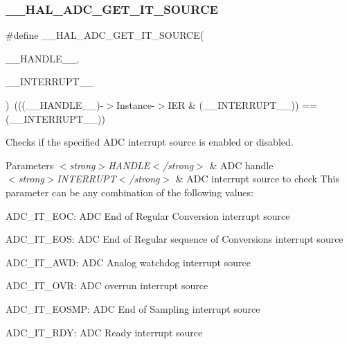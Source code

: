 \subsubsection{\texorpdfstring{\+\_\+\+\_\+\+H\+A\+L\+\_\+\+A\+D\+C\+\_\+\+G\+E\+T\+\_\+\+I\+T\+\_\+\+S\+O\+U\+R\+CE}{\_\_HAL\_ADC\_GET\_IT\_SOURCE}}
{\footnotesize\ttfamily \#define \+\_\+\+\_\+\+H\+A\+L\+\_\+\+A\+D\+C\+\_\+\+G\+E\+T\+\_\+\+I\+T\+\_\+\+S\+O\+U\+R\+CE(\begin{DoxyParamCaption}\item[{}]{\+\_\+\+\_\+\+H\+A\+N\+D\+L\+E\+\_\+\+\_\+,  }\item[{}]{\+\_\+\+\_\+\+I\+N\+T\+E\+R\+R\+U\+P\+T\+\_\+\+\_\+ }\end{DoxyParamCaption})~(((\+\_\+\+\_\+\+H\+A\+N\+D\+L\+E\+\_\+\+\_\+)-\/$>$Instance-\/$>$I\+ER \& (\+\_\+\+\_\+\+I\+N\+T\+E\+R\+R\+U\+P\+T\+\_\+\+\_\+)) == (\+\_\+\+\_\+\+I\+N\+T\+E\+R\+R\+U\+P\+T\+\_\+\+\_\+))}



Checks if the specified A\+DC interrupt source is enabled or disabled. 


\begin{DoxyParams}{Parameters}
{\em $<$strong$>$\+H\+A\+N\+D\+L\+E$<$/strong$>$} & A\+DC handle \\
\hline
{\em $<$strong$>$\+I\+N\+T\+E\+R\+R\+U\+P\+T$<$/strong$>$} & A\+DC interrupt source to check This parameter can be any combination of the following values\+: \begin{DoxyItemize}
\item A\+D\+C\+\_\+\+I\+T\+\_\+\+E\+OC\+: A\+DC End of Regular Conversion interrupt source \item A\+D\+C\+\_\+\+I\+T\+\_\+\+E\+OS\+: A\+DC End of Regular sequence of Conversions interrupt source \item A\+D\+C\+\_\+\+I\+T\+\_\+\+A\+WD\+: A\+DC Analog watchdog interrupt source \item A\+D\+C\+\_\+\+I\+T\+\_\+\+O\+VR\+: A\+DC overrun interrupt source \item A\+D\+C\+\_\+\+I\+T\+\_\+\+E\+O\+S\+MP\+: A\+DC End of Sampling interrupt source \item A\+D\+C\+\_\+\+I\+T\+\_\+\+R\+DY\+: A\+DC Ready interrupt source \end{DoxyItemize}
\\
\hline
\end{DoxyParams}

